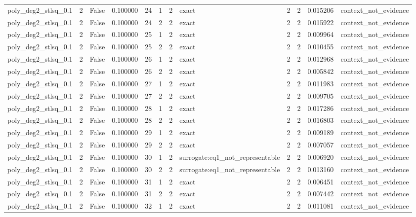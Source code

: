 \begin{tabular}{lrrrrrrlrrrl}
poly\_deg2\_stlsq\_0.1 & 2 & False & 0.100000 & 24 & 1 & 2 & exact & 2 & 2 & 0.015206 & context\_not\_evidence \\
poly\_deg2\_stlsq\_0.1 & 2 & False & 0.100000 & 24 & 2 & 2 & exact & 2 & 2 & 0.015922 & context\_not\_evidence \\
poly\_deg2\_stlsq\_0.1 & 2 & False & 0.100000 & 25 & 1 & 2 & exact & 2 & 2 & 0.009964 & context\_not\_evidence \\
poly\_deg2\_stlsq\_0.1 & 2 & False & 0.100000 & 25 & 2 & 2 & exact & 2 & 2 & 0.010455 & context\_not\_evidence \\
poly\_deg2\_stlsq\_0.1 & 2 & False & 0.100000 & 26 & 1 & 2 & exact & 2 & 2 & 0.012968 & context\_not\_evidence \\
poly\_deg2\_stlsq\_0.1 & 2 & False & 0.100000 & 26 & 2 & 2 & exact & 2 & 2 & 0.005842 & context\_not\_evidence \\
poly\_deg2\_stlsq\_0.1 & 2 & False & 0.100000 & 27 & 1 & 2 & exact & 2 & 2 & 0.011983 & context\_not\_evidence \\
poly\_deg2\_stlsq\_0.1 & 2 & False & 0.100000 & 27 & 2 & 2 & exact & 2 & 2 & 0.009705 & context\_not\_evidence \\
poly\_deg2\_stlsq\_0.1 & 2 & False & 0.100000 & 28 & 1 & 2 & exact & 2 & 2 & 0.017286 & context\_not\_evidence \\
poly\_deg2\_stlsq\_0.1 & 2 & False & 0.100000 & 28 & 2 & 2 & exact & 2 & 2 & 0.016803 & context\_not\_evidence \\
poly\_deg2\_stlsq\_0.1 & 2 & False & 0.100000 & 29 & 1 & 2 & exact & 2 & 2 & 0.009189 & context\_not\_evidence \\
poly\_deg2\_stlsq\_0.1 & 2 & False & 0.100000 & 29 & 2 & 2 & exact & 2 & 2 & 0.007057 & context\_not\_evidence \\
poly\_deg2\_stlsq\_0.1 & 2 & False & 0.100000 & 30 & 1 & 2 & surrogate:eq1\_not\_representable & 2 & 2 & 0.006920 & context\_not\_evidence \\
poly\_deg2\_stlsq\_0.1 & 2 & False & 0.100000 & 30 & 2 & 2 & surrogate:eq1\_not\_representable & 2 & 2 & 0.013160 & context\_not\_evidence \\
poly\_deg2\_stlsq\_0.1 & 2 & False & 0.100000 & 31 & 1 & 2 & exact & 2 & 2 & 0.006451 & context\_not\_evidence \\
poly\_deg2\_stlsq\_0.1 & 2 & False & 0.100000 & 31 & 2 & 2 & exact & 2 & 2 & 0.007442 & context\_not\_evidence \\
poly\_deg2\_stlsq\_0.1 & 2 & False & 0.100000 & 32 & 1 & 2 & exact & 2 & 2 & 0.011081 & context\_not\_evidence \\

\end{tabular}
